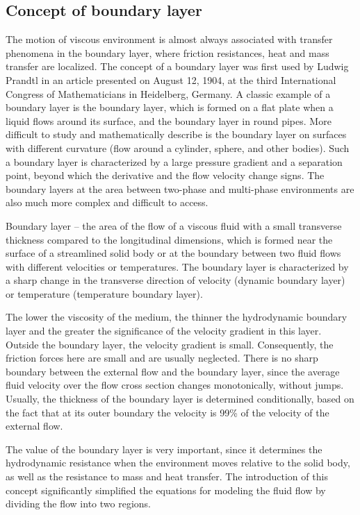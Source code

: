 \subsection{Concept of boundary layer}
	The motion of viscous environment is almost always associated with transfer phenomena in the boundary layer, where friction resistances, heat and mass transfer are localized. The concept of a boundary layer was first used by Ludwig Prandtl in an article presented on August 12, 1904, at the third International Congress of Mathematicians in Heidelberg, Germany. A classic example of a boundary layer is the boundary layer, which is formed on a flat plate when a liquid flows around its surface, and the boundary layer in round pipes. More difficult to study and mathematically describe is the boundary layer on surfaces with different curvature (flow around a cylinder, sphere, and other bodies). Such a boundary layer is characterized by a large pressure gradient and a separation point, beyond which the derivative and the flow velocity change signs. The boundary layers at the area between two-phase and multi-phase environments are also much more complex and difficult to access.
	
	Boundary layer -- the area of the flow of a viscous fluid with a small transverse thickness compared to the longitudinal dimensions, which is formed near the surface of a streamlined solid body or at the boundary between two fluid flows with different velocities or temperatures. The boundary layer is characterized by a sharp change in the transverse direction of velocity (dynamic boundary layer) or temperature (temperature boundary layer).
	
	The lower the viscosity of the medium, the thinner the hydrodynamic boundary layer and the greater the significance of the velocity gradient in this layer. Outside the boundary layer, the velocity gradient is small. Consequently, the friction forces here are small and are usually neglected. There is no sharp boundary between the external flow and the boundary layer, since the average fluid velocity over the flow cross section changes monotonically, without jumps. Usually, the thickness of the boundary layer is determined conditionally, based on the fact that at its outer boundary the velocity is 99\% of the velocity of the external flow.
	
	The value of the boundary layer is very important, since it determines the hydrodynamic resistance when the environment moves relative to the solid body, as well as the resistance to mass and heat transfer. The introduction of this concept significantly simplified the equations for modeling the fluid flow by dividing the flow into two regions.
	
